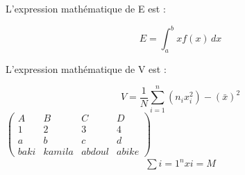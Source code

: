 \documentclass{article}
\begin{document}
L'expression mathématique de E est :

\[
E = \int_{a}^{b} x f(x) \,dx
\]

L'expression mathématique de V est :

\[
V = \frac{1}{N} \sum_{i=1}^{n} (n_i x_i^2) - \left( \bar{x} \right)^2
\]
$\left(\begin{array}{cccc}
A & B & C & D \\ 
1 & 2 & 3 & 4 \\ 
a & b & c & d \\ 
baki & kamila & abdoul & abike
\end{array}\right)$ 
\begin{eqnarray}
\sum{i=1}^n xi=M
\end{eqnarray}
\end{document}
